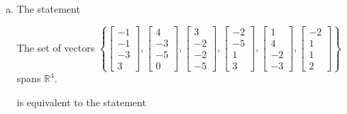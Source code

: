 \begin{exerciseAnswer}
\begin{enumerate}[(a)]
\item The statement 
\begin{center}\begin{minipage}{0.8\textwidth}
 The set of vectors \( \left\{ \left[\begin{array}{c}
-1 \\
-1 \\
-3 \\
3
\end{array}\right] , \left[\begin{array}{c}
4 \\
-3 \\
-5 \\
0
\end{array}\right] , \left[\begin{array}{c}
3 \\
-2 \\
-2 \\
-5
\end{array}\right] , \left[\begin{array}{c}
-2 \\
-5 \\
1 \\
3
\end{array}\right] , \left[\begin{array}{c}
1 \\
4 \\
-2 \\
-3
\end{array}\right] , \left[\begin{array}{c}
-2 \\
1 \\
1 \\
2
\end{array}\right] \right\} \) spans \(\mathbb{R}^4\). 
\end{minipage}\end{center}
     is equivalent to the statement 
\begin{center}\begin{minipage}{0.8\textwidth}
 The vector equation \( x_{1} \left[\begin{array}{c}
-1 \\
-1 \\
-3 \\
3
\end{array}\right] + x_{2} \left[\begin{array}{c}
4 \\
-3 \\

\end{array}
\end{minipage}
\end{center}
\end{enumerate}
\end{exerciseAnswer}
